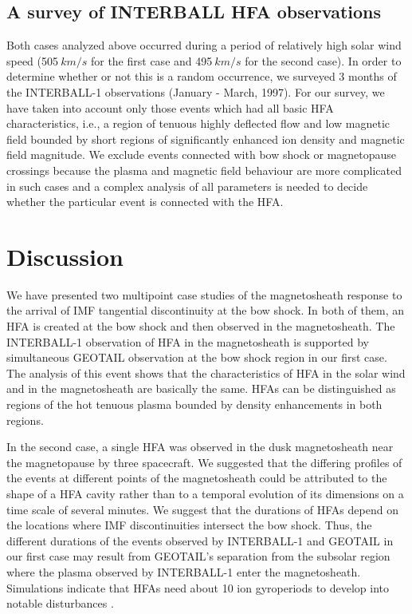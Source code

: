 \documentclass[11pt]{article}
\begin{document}
\begin{article}
\subsection{A survey of INTERBALL HFA observations}
Both cases analyzed above occurred during a period of relatively
high solar wind speed (505$\>km/s$ for the first case and
495$\>km/s$ for the
second case). In order to determine whether or not this is a random
occurrence, we surveyed  3 months of the INTERBALL-1
observations (January - March, 1997).
For our survey, we have taken into account only those events
which had all basic HFA characteristics, i.e., a region of tenuous
highly deflected flow and low magnetic field bounded by short
regions of significantly enhanced ion density and magnetic field
magnitude. We exclude events connected with bow shock or
magnetopause crossings because the plasma and magnetic field
behaviour are more complicated in such cases and a complex
analysis of all parameters is needed to decide whether the particular
event is connected with the HFA.

\section{Discussion}
We have presented two multipoint case studies of the
magnetosheath response to the arrival of  IMF tangential
discontinuity at the bow shock.
In both of them, an HFA is created at the bow shock and then
observed in the magnetosheath. The INTERBALL-1 observation of HFA
in the magnetosheath is supported by simultaneous GEOTAIL
observation at the bow shock region in our first case. The analysis
of this event shows that the characteristics of HFA in the
solar wind and in the magnetosheath are basically the same. HFAs
can be distinguished as regions of the hot tenuous plasma bounded
by density enhancements in both regions.

In the second case, a single HFA was observed in the dusk magnetosheath
near the magnetopause by three spacecraft.
We suggested that the differing profiles of the
events at different points of the magnetosheath could be attributed
to the shape of a HFA cavity rather than to a temporal evolution of
its dimensions on a time scale of several minutes.
We suggest that the durations of HFAs depend on the locations
where IMF discontinuities intersect the bow shock.
Thus, the different durations of the events observed by
INTERBALL-1 and GEOTAIL  in our first case  may result from
GEOTAIL's separation from the subsolar region where the plasma
observed by INTERBALL-1 enter the magnetosheath.
Simulations indicate that HFAs need about 10
ion gyroperiods to develop into notable disturbances \citep{th}.


\end{article}
\end{document}
